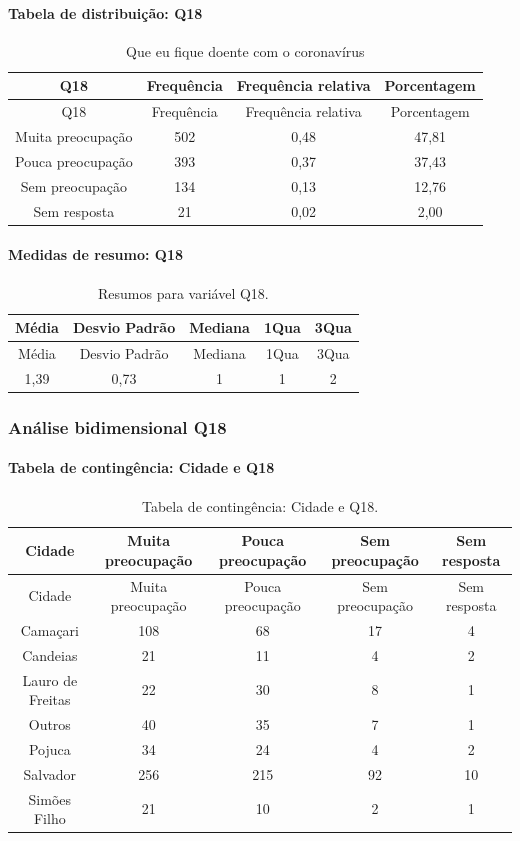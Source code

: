 \documentclass[]{article}
\let\oldparagraph\paragraph
\renewcommand{\paragraph}[1]{\oldparagraph{#1}\mbox{}}
\begin{document}
\hypertarget{tabela-de-distribuiuxe7uxe3o-q18}{%
\paragraph{Tabela de distribuição: Q18}\label{tabela-de-distribuiuxe7uxe3o-q18}}

\begin{longtable}[]{@{}cccc@{}}
\caption{\label{tab:unnamed-chunk-217}Que eu fique doente com o coronavírus}\tabularnewline
\toprule
Q18 & Frequência & Frequência relativa & Porcentagem\tabularnewline
\midrule
\endfirsthead
\toprule
Q18 & Frequência & Frequência relativa & Porcentagem\tabularnewline
\midrule
\endhead
Muita preocupação & 502 & 0,48 & 47,81\tabularnewline
Pouca preocupação & 393 & 0,37 & 37,43\tabularnewline
Sem preocupação & 134 & 0,13 & 12,76\tabularnewline
Sem resposta & 21 & 0,02 & 2,00\tabularnewline
\bottomrule
\end{longtable}

\hypertarget{medidas-de-resumo-q18}{%
\paragraph{Medidas de resumo: Q18}\label{medidas-de-resumo-q18}}

\begin{longtable}[]{@{}ccccc@{}}
\caption{\label{tab:unnamed-chunk-218}Resumos para variável Q18.}\tabularnewline
\toprule
Média & Desvio Padrão & Mediana & 1Qua & 3Qua\tabularnewline
\midrule
\endfirsthead
\toprule
Média & Desvio Padrão & Mediana & 1Qua & 3Qua\tabularnewline
\midrule
\endhead
1,39 & 0,73 & 1 & 1 & 2\tabularnewline
\bottomrule
\end{longtable}

\cleardoublepage

\hypertarget{anuxe1lise-bidimensional-q18}{%
\subsubsection{Análise bidimensional Q18}\label{anuxe1lise-bidimensional-q18}}

\hypertarget{tabela-de-continguxeancia-cidade-e-q18}{%
\paragraph{Tabela de contingência: Cidade e Q18}\label{tabela-de-continguxeancia-cidade-e-q18}}

\begin{longtable}[]{@{}ccccc@{}}
\caption{\label{tab:unnamed-chunk-219}Tabela de contingência: Cidade e Q18.}\tabularnewline
\toprule
Cidade & Muita preocupação & Pouca preocupação & Sem preocupação & Sem resposta\tabularnewline
\midrule
\endfirsthead
\toprule
Cidade & Muita preocupação & Pouca preocupação & Sem preocupação & Sem resposta\tabularnewline
\midrule
\endhead
Camaçari & 108 & 68 & 17 & 4\tabularnewline
Candeias & 21 & 11 & 4 & 2\tabularnewline
Lauro de Freitas & 22 & 30 & 8 & 1\tabularnewline
Outros & 40 & 35 & 7 & 1\tabularnewline
Pojuca & 34 & 24 & 4 & 2\tabularnewline
Salvador & 256 & 215 & 92 & 10\tabularnewline
Simões Filho & 21 & 10 & 2 & 1\tabularnewline
\bottomrule
\end{longtable}
\end{document}
